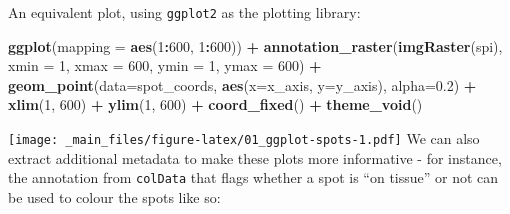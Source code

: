 \documentclass[
]{book}
\newenvironment{Shaded}{\begin{snugshade}}{\end{snugshade}}
\newcommand{\AttributeTok}[1]{\textcolor[rgb]{0.13,0.29,0.53}{#1}}
\newcommand{\DecValTok}[1]{\textcolor[rgb]{0.00,0.00,0.81}{#1}}
\newcommand{\FloatTok}[1]{\textcolor[rgb]{0.00,0.00,0.81}{#1}}
\newcommand{\FunctionTok}[1]{\textcolor[rgb]{0.13,0.29,0.53}{\textbf{#1}}}
\newcommand{\NormalTok}[1]{#1}
\newcommand{\SpecialCharTok}[1]{\textcolor[rgb]{0.81,0.36,0.00}{\textbf{#1}}}
\begin{document}
An equivalent plot, using \texttt{ggplot2} as the plotting library:

\begin{Shaded}
\begin{Highlighting}[]
\FunctionTok{ggplot}\NormalTok{(}\AttributeTok{mapping =} \FunctionTok{aes}\NormalTok{(}\DecValTok{1}\SpecialCharTok{:}\DecValTok{600}\NormalTok{, }\DecValTok{1}\SpecialCharTok{:}\DecValTok{600}\NormalTok{)) }\SpecialCharTok{+}
  \FunctionTok{annotation\_raster}\NormalTok{(}\FunctionTok{imgRaster}\NormalTok{(spi), }\AttributeTok{xmin =} \DecValTok{1}\NormalTok{, }\AttributeTok{xmax =} \DecValTok{600}\NormalTok{, }\AttributeTok{ymin =} \DecValTok{1}\NormalTok{, }\AttributeTok{ymax =} \DecValTok{600}\NormalTok{) }\SpecialCharTok{+}
  \FunctionTok{geom\_point}\NormalTok{(}\AttributeTok{data=}\NormalTok{spot\_coords, }\FunctionTok{aes}\NormalTok{(}\AttributeTok{x=}\NormalTok{x\_axis, }\AttributeTok{y=}\NormalTok{y\_axis), }\AttributeTok{alpha=}\FloatTok{0.2}\NormalTok{) }\SpecialCharTok{+} \FunctionTok{xlim}\NormalTok{(}\DecValTok{1}\NormalTok{, }\DecValTok{600}\NormalTok{) }\SpecialCharTok{+} \FunctionTok{ylim}\NormalTok{(}\DecValTok{1}\NormalTok{, }\DecValTok{600}\NormalTok{) }\SpecialCharTok{+}
  \FunctionTok{coord\_fixed}\NormalTok{() }\SpecialCharTok{+} 
  \FunctionTok{theme\_void}\NormalTok{()}
\end{Highlighting}
\end{Shaded}

\texttt{[image: \_main\_files/figure-latex/01\_ggplot-spots-1.pdf]}
We can also extract additional metadata to make these plots more informative - for instance, the annotation from \texttt{colData} that flags whether a spot is ``on tissue'' or not can be used to colour the spots like so:
\end{document}
